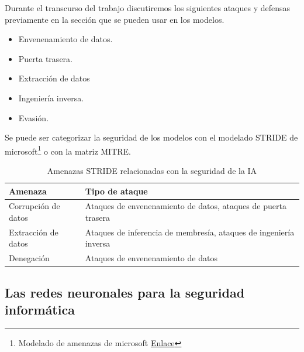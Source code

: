 Durante el transcurso del trabajo discutiremos los siguientes ataques y defensas previamente en la sección  que se pueden usar en los modelos.

\begin{itemize}
    \item Envenenamiento de datos.
    \item Puerta trasera.
    \item Extracción de datos
    \item Ingeniería inversa.
    \item Evasión.
\end{itemize}

Se puede ser categorizar la seguridad de los modelos con el modelado \gls{STRIDE} de microsoft\footnote{Modelado de amenazas de microsoft \href{https://learn.microsoft.com/es-es/azure/security/develop/threat-modeling-tool-threats}{Enlace}} o con la matriz \gls{MITRE}.

\begin{table}[H]
    \centering
    \small
    \begin{tabularx}{\textwidth}{|l|X|}
        \hline
        \textbf{Amenaza}    & \textbf{Tipo de ataque}                                           \\
        \hline
        Corrupción de datos & Ataques de envenenamiento de datos, ataques de puerta trasera     \\
        Extracción de datos & Ataques de inferencia de membresía, ataques de ingeniería inversa \\
        Denegación          & Ataques de envenenamiento de datos                                \\
        \hline
    \end{tabularx}
    \caption{Amenazas STRIDE relacionadas con la seguridad de la IA}
    \label{tab:amenazas}
\end{table}


\subsection{Las redes neuronales para la seguridad informática}



